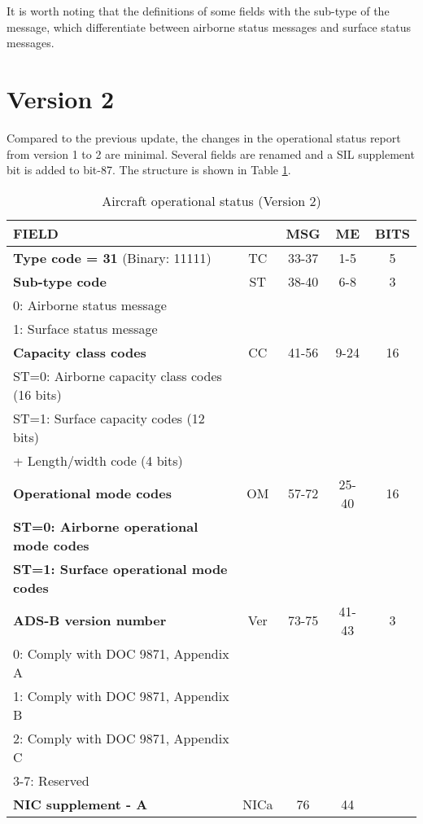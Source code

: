 It is worth noting that the definitions of some fields with the sub-type of the message, which differentiate between airborne status messages and surface status messages.


\section{Version 2}

Compared to the previous update, the changes in the operational status report from version 1 to 2 are minimal. Several fields are renamed and a SIL supplement bit is added to bit-87. The structure is shown in Table \ref{tb:adsb-operational-status-v2}.


\begin{table}[ht]
\caption{Aircraft operational status (Version 2)}
\label{tb:adsb-operational-status-v2}
\footnotesize
\begin{tabular}{|l|c|c|c|c|}
\hline
\textbf{FIELD} &  & \textbf{MSG} & \textbf{ME} & \textbf{BITS} \\ \hline
\textbf{Type code = 31} (Binary: 11111) & TC & 33-37 & 1-5 & 5 \\ \hline
\textbf{Sub-type code} & ST & 38-40 & 6-8 & 3 \\
0: Airborne status message &&&& \\
1: Surface status message &&&& \\ \hline
\textbf{Capacity class codes} & CC & 41-56 & 9-24 & 16 \\
ST=0: Airborne capacity class codes (16 bits) &&&& \\
ST=1: Surface capacity codes (12 bits) &&&& \\
\quad\qquad+ Length/width code (4 bits) &&&& \\ \hline
\textbf{Operational mode codes} & OM & 57-72 & 25-40 & 16 \\
\textbf{ST=0: Airborne operational mode codes} &&&&\\
\textbf{ST=1: Surface operational mode codes} &&&& \\ \hline
\textbf{ADS-B version number} & Ver & 73-75 & 41-43 & 3\\ 
0: Comply with DOC 9871, Appendix A &&&&\\ 
1: Comply with DOC 9871, Appendix B &&&&\\ 
2: Comply with DOC 9871, Appendix C &&&&\\ 
3-7: Reserved &&&& \\ \hline
\textbf{NIC supplement - A} & NICa & 76 & 44 &  \\ \hline

\end{tabular}
\end{table}
